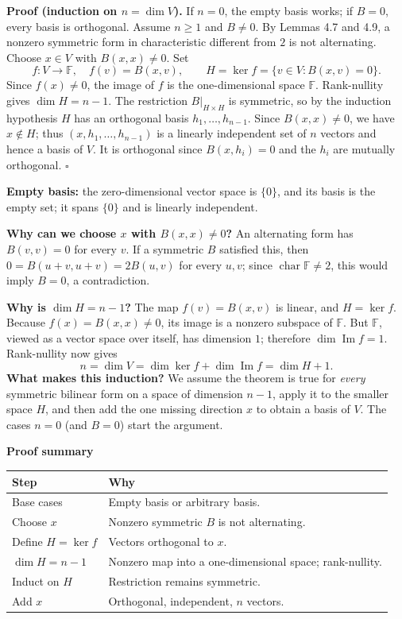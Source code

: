 \documentclass[11pt,a4paper]{article}
\newcommand{\F}{\mathbb F}
\newcommand{\prooftable}[1]{\medskip\textbf{Proof summary}\par\smallskip #1\medskip}
\begin{document}
\textbf{Proof (induction on \(n=\dim V\)).}
If \(n=0\), the empty basis works; if \(B=0\), every basis is orthogonal.
Assume \(n\geq1\) and \(B\neq0\). By Lemmas 4.7 and 4.9, a nonzero symmetric form in characteristic different from \(2\) is not alternating. Choose \(x\in V\) with \(B(x,x)\neq0\).
Set
\[
f:V\to\F,\quad f(v)=B(x,v),\qquad
H=\ker f=\{v\in V:B(x,v)=0\}.
\]
Since \(f(x)\neq0\), the image of \(f\) is the one-dimensional space \(\F\). Rank-nullity gives \(\dim H=n-1\).
The restriction \(B|_{H\times H}\) is symmetric, so by the induction hypothesis \(H\) has an orthogonal basis \(h_1,\ldots,h_{n-1}\).
Since \(B(x,x)\neq0\), we have \(x\notin H\); thus
\((x,h_1,\ldots,h_{n-1})\) is a linearly independent set of \(n\) vectors and hence a basis of \(V\). It is orthogonal since \(B(x,h_i)=0\) and the \(h_i\) are mutually orthogonal. \(\square\)

\begin{personalnote}[title=Definitions for understanding]
\textbf{Empty basis:} the zero-dimensional vector space is \(\{0\}\), and its basis is the empty set; it spans \(\{0\}\) and is linearly independent.

\textbf{Why can we choose \(x\) with \(B(x,x)\neq0\)?}
An alternating form has \(B(v,v)=0\) for every \(v\).
If a symmetric \(B\) satisfied this, then
\(0=B(u+v,u+v)=2B(u,v)\) for every \(u,v\);
since \(\operatorname{char}\F\neq2\), this would imply \(B=0\), a contradiction.
\end{personalnote}
\begin{personalnote}
\textbf{Why is \(\dim H=n-1\)?}
The map \(f(v)=B(x,v)\) is linear, and \(H=\ker f\).
Because \(f(x)=B(x,x)\neq0\), its image is a nonzero subspace of \(\F\).
But \(\F\), viewed as a vector space over itself, has dimension \(1\);
therefore \(\dim\operatorname{Im}f=1\). Rank-nullity now gives
\[
n=\dim V=\dim\ker f+\dim\operatorname{Im}f=\dim H+1.
\]
\textbf{What makes this induction?}
We assume the theorem is true for \emph{every} symmetric bilinear form
on a space of dimension \(n-1\), apply it to the smaller space \(H\),
and then add the one missing direction \(x\) to obtain a basis of \(V\).
The cases \(n=0\) (and \(B=0\)) start the argument.
\end{personalnote}
\prooftable{\begin{tabularx}{\linewidth}{@{}p{.29\linewidth}X@{}}\hline
Step & Why\\\hline
Base cases & Empty basis or arbitrary basis.\\
Choose \(x\) & Nonzero symmetric \(B\) is not alternating.\\
Define \(H=\ker f\) & Vectors orthogonal to \(x\).\\
\(\dim H=n-1\) & Nonzero map into a one-dimensional space; rank-nullity.\\
Induct on \(H\) & Restriction remains symmetric.\\
Add \(x\) & Orthogonal, independent, \(n\) vectors.\\\hline
\end{tabularx}}
\end{document}

